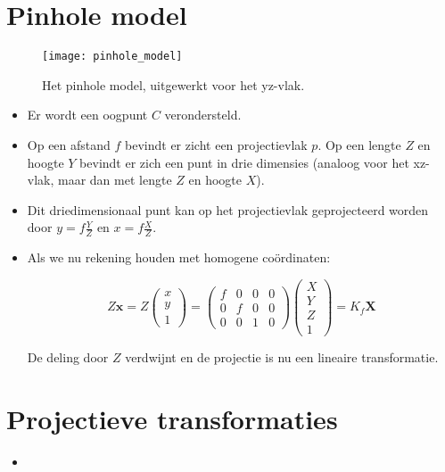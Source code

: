 \section{Pinhole model}
\begin{figure}[h]
	\texttt{[image: pinhole\_model]}
	\caption{Het pinhole model, uitgewerkt voor het yz-vlak.}
	\label{fig:pinhole_model}
\end{figure}
\begin{itemize}
	\item Er wordt een oogpunt $C$ verondersteld.
	\item Op een afstand $f$ bevindt er zicht een projectievlak $p$. 
	Op een lengte $Z$ en hoogte $Y$ bevindt er zich een punt in drie dimensies (analoog voor het xz-vlak, maar dan met lengte $Z$ en hoogte $X$).
	\item Dit driedimensionaal punt kan op het projectievlak geprojecteerd worden door $y = f\frac{Y}{Z}$ en $x = f\frac{X}{Z}$.
	\item Als we nu rekening houden met homogene coördinaten:
	
	$$Z\textbf{x} = Z\begin{pmatrix}
	x \\ y \\ 1
	\end{pmatrix}
	=
	\begin{pmatrix}
	f & 0 & 0 & 0 \\
	0 & f & 0 & 0 \\
	0 & 0 & 1 & 0
	\end{pmatrix}
	\begin{pmatrix}
	X \\ Y \\ Z \\ 1
	\end{pmatrix}
	=
	K_f\textbf{X}$$
	
	De deling door $Z$ verdwijnt en de projectie is nu een lineaire transformatie.
\end{itemize}

\section{Projectieve transformaties}
\begin{itemize}
	\item 
\end{itemize}


